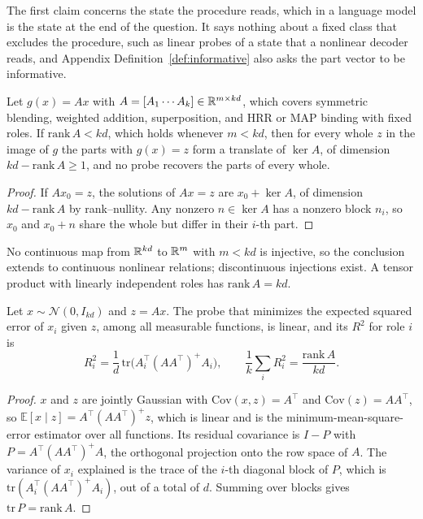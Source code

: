 \noindent
The first claim concerns the state the procedure reads, which in a language model is the state at the end of the question. It says nothing about a fixed class that excludes the procedure, such as linear probes of a state that a nonlinear decoder reads, and Appendix Definition~\ref{def:informative} also asks the part vector to be informative.

\begin{proposition}
\label{prop:fiber}
Let $g(x) = Ax$ with $A = [A_1 \cdots A_k] \in \mathbb{R}^{m \times kd}$, which covers symmetric blending, weighted addition, superposition, and HRR or MAP binding with fixed roles. If $\mathrm{rank}\,A < kd$, which holds whenever $m < kd$, then for every whole $z$ in the image of $g$ the parts with $g(x) = z$ form a translate of $\ker A$, of dimension $kd - \mathrm{rank}\,A \geq 1$, and no probe recovers the parts of every whole.
\end{proposition}

\begin{proof}
If $Ax_0 = z$, the solutions of $Ax = z$ are $x_0 + \ker A$, of dimension $kd - \mathrm{rank}\,A$ by rank--nullity. Any nonzero $n \in \ker A$ has a nonzero block $n_i$, so $x_0$ and $x_0 + n$ share the whole but differ in their $i$-th part.
\end{proof}

\begin{remark}
No continuous map from $\mathbb{R}^{kd}$ to $\mathbb{R}^m$ with $m < kd$ is injective, so the conclusion extends to continuous nonlinear relations; discontinuous injections exist. A tensor product with linearly independent roles has $\mathrm{rank}\,A = kd$.
\end{remark}

\begin{proposition}
\label{prop:ceiling}
Let $x \sim \mathcal{N}(0, I_{kd})$ and $z = Ax$. The probe that minimizes the expected squared error of $x_i$ given $z$, among all measurable functions, is linear, and its $R^2$ for role $i$ is
\begin{equation}
  R^2_i = \frac{1}{d}\,\mathrm{tr}\big(A_i^{\top} (A A^{\top})^{+} A_i\big), \qquad \frac{1}{k}\sum_i R^2_i = \frac{\mathrm{rank}\,A}{kd}.
\end{equation}
\end{proposition}

\begin{proof}
$x$ and $z$ are jointly Gaussian with $\mathrm{Cov}(x, z) = A^{\top}$ and $\mathrm{Cov}(z) = AA^{\top}$, so $\mathbb{E}[x \mid z] = A^{\top}(AA^{\top})^{+}z$, which is linear and is the minimum-mean-square-error estimator over all functions. Its residual covariance is $I - P$ with $P = A^{\top}(AA^{\top})^{+}A$, the orthogonal projection onto the row space of $A$. The variance of $x_i$ explained is the trace of the $i$-th diagonal block of $P$, which is $\mathrm{tr}(A_i^{\top}(AA^{\top})^{+}A_i)$, out of a total of $d$. Summing over blocks gives $\mathrm{tr}\,P = \mathrm{rank}\,A$.
\end{proof}

